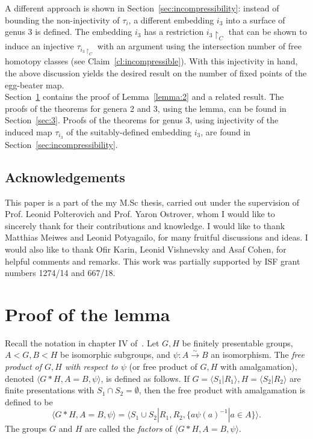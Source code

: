 \documentclass[11pt]{article}
\begin{document}
        A different approach is shown in Section~\ref{sec:incompressibility}: instead of bounding the non-injectivity of $\tau_i$, a different embedding $i_3$ into a surface of genus 3 is defined. The embedding $i_3$ has a restriction $i_3 \restriction_C$ that can be shown to induce an injective $\tau_{i_3 \restriction_C}$ with an argument using the intersection number of free homotopy classes (see Claim~\ref{cl:incompressible}). With this injectivity in hand, the above discussion yields the desired result on the number of fixed points of the egg-beater map. \\
    
        Section~\ref{sec:2} contains the proof of Lemma~\ref{lemma:2} and a related result. The proofs of the theorems for genera 2 and 3, using the lemma, can be found in Section~\ref{sec:3}. Proofs of the theorems for genus 3, using injectivity of the induced map $\tau_{i_3}$ of the suitably-defined embedding $i_3$, are found in Section~\ref{sec:incompressibility}.

    \subsection{Acknowledgements}
        This paper is a part of the my M.Sc thesis, carried out under the supervision of Prof. Leonid Polterovich and Prof. Yaron Ostrover, whom I would like to sincerely thank for their contributions and knowledge. I would like to thank Matthias Meiwes and Leonid Potyagailo, for many fruitful discussions and ideas. I would also like to thank Ofir Karin, Leonid Vishnevsky and Asaf Cohen, for helpful comments and remarks. This work was partially supported by ISF grant numbers 1274/14 and 667/18.

\section{Proof of the lemma}\label{sec:2}
    Recall the notation in chapter IV of~\cite{LS}. Let $G,H$ be finitely presentable groups, $A < G, B < H$ be isomorphic subgroups, and $\psi: A \xrightarrow{\sim} B$ an isomorphism. The \textit{free product of $G,H$ with respect to $\psi$} (or free product of $G,H$ with amalgamation), denoted $\langle G * H, A = B, \psi \rangle$, is defined as follows. If $G = \langle S_1 | R_1 \rangle, H = \langle S_2 | R_2 \rangle$ are finite presentations with $S_1 \cap S_2 = \emptyset$, then the free product with amalgamation is defined to be
    \[
        \langle G * H, A = B, \psi \rangle = \langle S_1 \cup S_2 | R_1, R_2, \{a \psi(a)^{-1} | a \in A\} \rangle .
    \]
    The groups $G$ and $H$ are called the \textit{factors} of $\langle G * H, A = B, \psi \rangle$.
    
\end{document}
